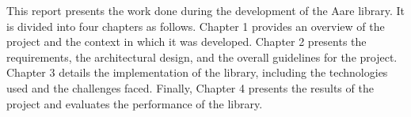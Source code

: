 \begin{spacing}{1.2}
This report presents the work done during the development of the Aare library. It is divided into 
four chapters as follows. Chapter 1 provides an overview of the project and the context in which
it was developed. Chapter 2 presents the requirements, the architectural design, and the 
overall guidelines for the project. Chapter 3 details the implementation of the library,
including the technologies used and the challenges faced. Finally, Chapter 4 presents the
results of the project and evaluates the performance of the library.\\








\end{spacing}


